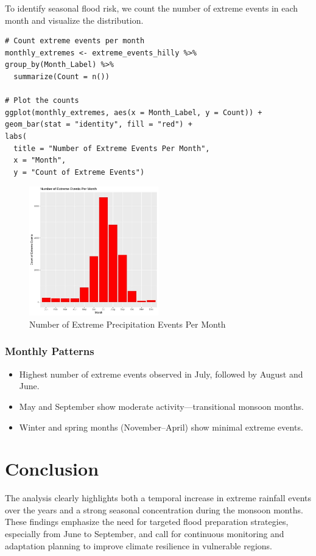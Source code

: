 To identify seasonal flood risk, we count the number of extreme events in each month and visualize the distribution.

\begin{verbatim}
# Count extreme events per month
monthly_extremes <- extreme_events_hilly %>%
group_by(Month_Label) %>%
  summarize(Count = n())

# Plot the counts
ggplot(monthly_extremes, aes(x = Month_Label, y = Count)) +
geom_bar(stat = "identity", fill = "red") +
labs(
  title = "Number of Extreme Events Per Month",
  x = "Month", 
  y = "Count of Extreme Events")
\end{verbatim}

\begin{figure}[h]
    \centering
    \includegraphics[width=0.5\textwidth]{figures/extreme_hilly.jpg}
    \caption{Number of Extreme Precipitation Events Per Month}
\end{figure}

\subsubsection*{Monthly Patterns}

\begin{itemize}
    \item Highest number of extreme events observed in July, followed by August and June.
    \item May and September show moderate activity—transitional monsoon months.
    \item Winter and spring months (November–April) show minimal extreme events.
\end{itemize}

\section*{Conclusion}

The analysis clearly highlights both a temporal increase in extreme rainfall events over the years and a strong seasonal concentration during the monsoon months. These findings emphasize the need for targeted flood preparation strategies, especially from June to September, and call for continuous monitoring and adaptation planning to improve climate resilience in vulnerable regions.

